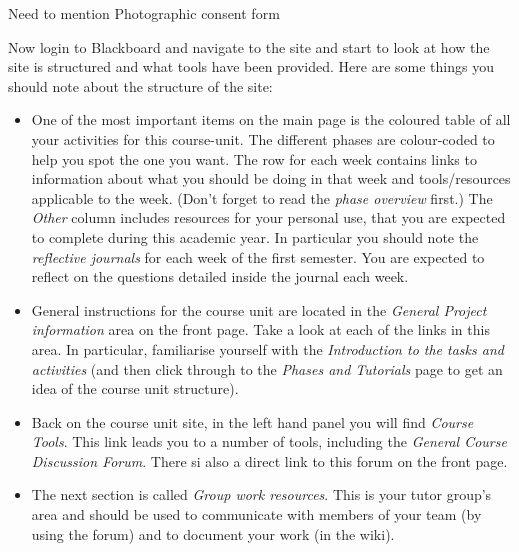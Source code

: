 \begin{firstonly}
\begin{note}
  Need to mention Photographic consent form
\end{note}

Now login to Blackboard and navigate to the  site and start to look at how the site is structured and what tools have been provided.
Here are some things you should note about the structure of the site:



\begin{itemize}
\item One of the most important items on the main page is the coloured table of all your activities for this course-unit. The different phases are colour-coded to help you spot the one you want. The row for each week contains links to information about what you should be doing in that week and tools/resources applicable to the week. (Don't forget to read the \emph{phase overview} first.)
   The \emph{Other}  column includes resources for your personal use, that you are expected to complete during this academic year. In particular you should note the \emph{reflective journals} for each week of the first semester. You are expected to reflect on the questions detailed inside the journal each week.
\item
General  instructions for the course unit are located in the \emph{General Project information} area on the front page. Take a look at each of the links in this area. In particular, familiarise yourself with  the \emph{Introduction to the tasks and activities} (and then click through to the \emph{Phases and Tutorials} page to get an idea of the course unit structure).

\item Back on the course unit site, in the left hand panel you will find \emph{Course Tools}. This link leads you to a number of tools, including the \emph{General Course Discussion Forum}. There si also a direct link to this forum on the front page.

\item The next section is called \emph{Group work resources}. This is your tutor group's area and should be used to communicate with members of your team (by using the forum) and to document your work (in the wiki).


\end{itemize}
\end{firstonly}
